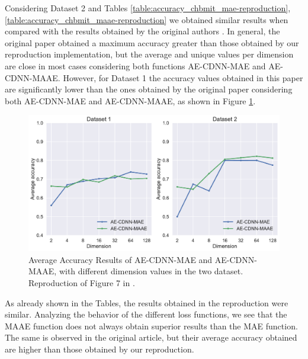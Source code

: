 Considering Dataset 2 and Tables \ref{table:accuracy_chbmit_mae-reproduction}, \ref{table:accuracy_chbmit_maae-reproduction} we obtained similar results when compared with the results obtained by the original authors \cite{WenZha:2018}. In general, the original paper obtained a maximum accuracy greater than those obtained by our reproduction implementation, but the average and unique values per dimension are close in most cases considering both functions AE-CDNN-MAE and AE-CDNN-MAAE. However, for Dataset 1 the accuracy values obtained in this paper are significantly lower than the ones obtained by the original paper considering both AE-CDNN-MAE and AE-CDNN-MAAE, as shown in Figure \ref{fig:average}. 


\begin{figure}[!ht]
\centering
\includegraphics[width=0.8\linewidth]{figure/average-MAE-MAAE.pdf}
  \caption{Average Accuracy Results of AE-CDNN-MAE and AE-CDNN-MAAE, with different dimension values in the two dataset. Reproduction of Figure 7 in \cite{WenZha:2018}. }
\label{fig:average}
\end{figure}

As already shown in the Tables, the results obtained in the reproduction were similar. Analyzing the behavior of the different loss functions, we see that the MAAE function does not always obtain superior results than the MAE function. The same is observed in the original article, but their average accuracy obtained are higher than those obtained by our reproduction. 


